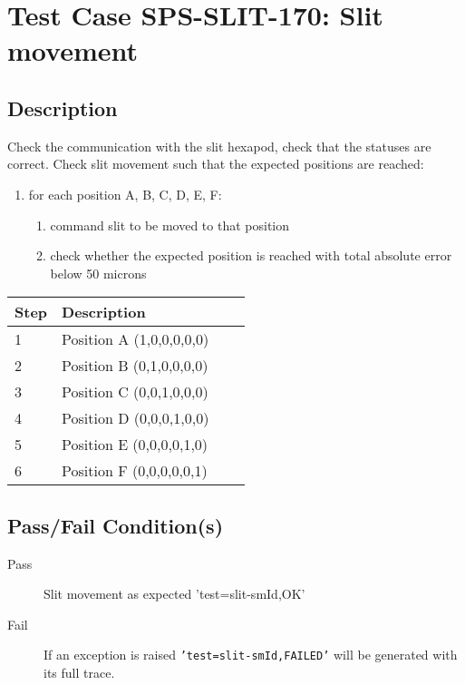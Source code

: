 \section{Test Case SPS-SLIT-170: Slit movement}

\subsection{Description}

Check the communication with the slit hexapod, check that the statuses are correct.
Check slit movement such that the expected positions are reached:

\begin{enumerate}
    \item for each position A, B, C, D, E, F:
    \begin{enumerate}
        \item command slit to be moved to that position
        \item check whether the expected position is reached with total absolute error below 50 microns
    \end{enumerate}
\end{enumerate}

\begin{table}[H]
    \begin{tabular}{|l| p{5cm} |l| p{5cm} |}
    \hline
    {\bf Step} & {\bf Description}  \\ \hline
    1 & Position A (1,0,0,0,0,0) \\ \hline
    2 & Position B (0,1,0,0,0,0) \\ \hline
    3 & Position C (0,0,1,0,0,0) \\ \hline
    4 & Position D (0,0,0,1,0,0) \\ \hline
    5 & Position E (0,0,0,0,1,0) \\ \hline
    6 & Position F (0,0,0,0,0,1) \\ \hline
    \end{tabular}
\end{table}

\subsection{Pass/Fail Condition(s)}

\begin{description}
\item [Pass] Slit movement as expected {'test=slit-smId,OK'}
\item [Fail] If an exception is raised \texttt{'test=slit-smId,FAILED'} will be generated with its full trace.
\end{description}

